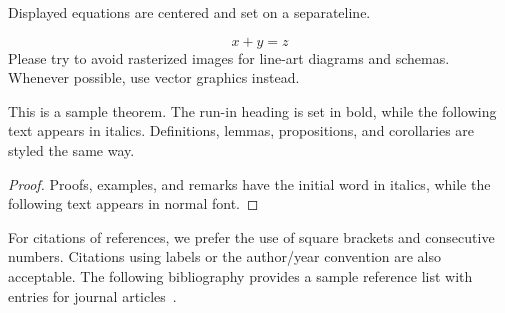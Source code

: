 \documentclass[runningheads]{llncs}
\begin{document}
\noindent Displayed equations are centered and set on a separateline.

\begin{equation}
    x + y = z
\end{equation}
Please try to avoid rasterized images for line-art diagrams and schemas. Whenever possible, use 
vector graphics instead.


\begin{theorem}
    This is a sample theorem. The run-in heading is set in bold, while
    the following text appears in italics. Definitions, lemmas,
    propositions, and corollaries are styled the same way.
\end{theorem}
%
%
\begin{proof}
    Proofs, examples, and remarks have the initial word in italics,
    while the following text appears in normal font.
\end{proof}
For citations of references, we prefer the use of square brackets
and consecutive numbers. Citations using labels or the author/year
convention are also acceptable. The following bibliography provides
a sample reference list with entries for journal
articles~\cite{Dardha2017}.



\end{document}
